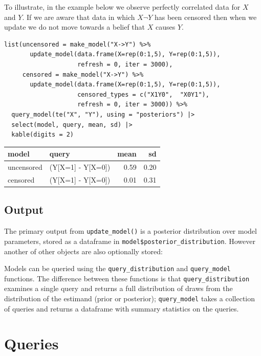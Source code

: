 \documentclass[
  article]{jss}
\begin{document}
To illustrate, in the example below we observe perfectly correlated data
for \(X\) and \(Y\). If we are aware that data in which \(X \neg Y\) has
been censored then when we update we do not move towards a belief that
\(X\) causes \(Y\).

\begin{verbatim}
list(uncensored = make_model("X->Y") %>%
       update_model(data.frame(X=rep(0:1,5), Y=rep(0:1,5)),
                    refresh = 0, iter = 3000),
     censored = make_model("X->Y") %>%
       update_model(data.frame(X=rep(0:1,5), Y=rep(0:1,5)),
                    censored_types = c("X1Y0",  "X0Y1"),
                    refresh = 0, iter = 3000)) %>%
  query_model(te("X", "Y"), using = "posteriors") |>
  select(model, query, mean, sd) |>
  kable(digits = 2)
\end{verbatim}

\begin{longtable}[]{@{}llrr@{}}
\toprule()
model & query & mean & sd \\
\midrule()
\endhead
uncensored & (Y{[}X=1{]} - Y{[}X=0{]}) & 0.59 & 0.20 \\
censored & (Y{[}X=1{]} - Y{[}X=0{]}) & 0.01 & 0.31 \\
\bottomrule()
\end{longtable}

\hypertarget{output}{%
\subsection{Output}\label{output}}

The primary output from \texttt{update\_model()} is a posterior
distribution over model parameters, stored as a dataframe in
\texttt{model\$posterior\_distribution}. However another of other
objects are also optionally stored:

Models can be queried using the \texttt{query\_distribution} and
\texttt{query\_model} functions. The difference between these functions
is that \texttt{query\_distribution} examines a single query and returns
a full distribution of draws from the distribution of the estimand
(prior or posterior); \texttt{query\_model} takes a collection of
queries and returns a dataframe with summary statistics on the queries.

\hypertarget{queries}{%
\section{Queries}\label{queries}}
\end{document}
